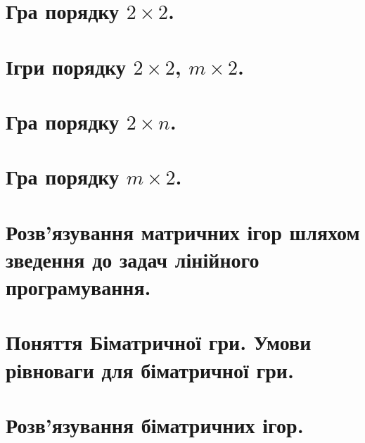 \documentclass[12pt,a4paper]{article}
\begin{document}
\clearpage

\section{Гра порядку $2 \times 2$.}

\clearpage

\section{Ігри порядку $2 \times 2$, $m \times 2$.}

\clearpage

\section{Гра порядку $2 \times n$.}

\clearpage

\section{Гра порядку $m \times 2$.}

\clearpage

\section{Розв'язування матричних ігор шляхом зведення до задач лінійного програмування.}

\clearpage

\section{Поняття Біматричної гри. Умови рівноваги для біматричної гри.}

\clearpage

\section{Розв'язування біматричних ігор.}
\end{document}
